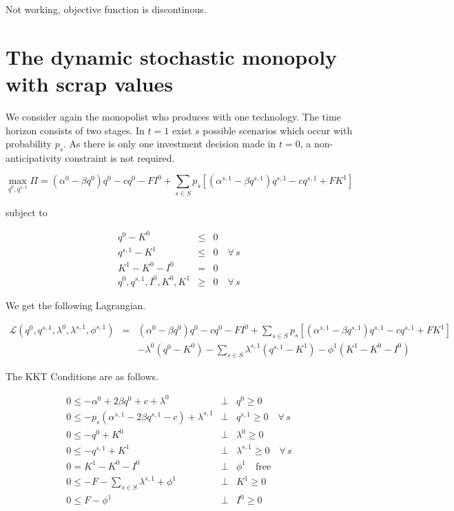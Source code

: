 \documentclass[11pt,a4paper]{article}
\begin{document}
Not working, objective function is discontinous.

\section{The dynamic stochastic monopoly with scrap values}


We consider again the monopolist who produces with one technology. The time horizon consists of two stages. In $t=1$ exist $s$ possible scenarios which occur with probability $p_s$. As there is only one investment decision made in $t=0$, a non-anticipativity constraint is not required. 

\begin{equation*}
	\max_{q^0,q^{s,1}}\Pi = (\alpha^0-\beta q^0)q^0 - cq^0 -FI^0 +  \sum_{s\in S}p_s\left[(\alpha^{s,1}-\beta q^{s,1})q^{s,1} - cq^{s,1} + FK^1\right] 
\end{equation*}

subject to

\begin{eqnarray*}
	q^0 - K^0 &\leq& 0\\
	q^{s,1} - K^{1} &\leq& 0\quad\forall\, s\\
        K^{1} - K^0 - I^0 &=& 0\\
	q^0,q^{s,1},I^0,K^0,K^{1} &\geq& 0\quad\forall\, s 
\end{eqnarray*}
 
We get the following Lagrangian.

\begin{eqnarray*}
	\mathcal{L}(q^0,q^{s,1},\lambda^0,\lambda^{s,1},\phi^{s,1})&=& (\alpha^0-\beta q^0)q^0 - cq^0 - FI^0 + \sum_{s\in S}p_s\left[(\alpha^{s,1}-\beta q^{s,1})q^{s,1} - cq^{s,1} + FK^1\right]  \\
        && - \lambda^0(q^0-K^0) - \sum_{s\in S}\lambda^{s,1}(q^{s,1}-K^{1}) - \phi^{1}(K^{1}-K^0-I^0)
\end{eqnarray*}

The KKT Conditions are as follows.

\begin{eqnarray*}
	0 \leq -\alpha^0 + 2\beta q^0 + c + \lambda^0 &\bot& q^0 \geq 0\\
        0 \leq -p_s\left(\alpha^{s,1} - 2\beta q^{s,1} - c\right) + \lambda^{s,1} &\bot& q^{s,1} \geq 0\quad\forall\,s\\
	0 \leq -q^0 + K^0 &\bot& \lambda^0 \geq 0 \\
        0 \leq -q^{s,1} + K^{1} &\bot& \lambda^{s,1} \geq 0 \quad\forall\,s\\
        0 = K^1 - K^0 - I^0 &\bot& \phi^1 \quad \mbox{free} \\
        0 \leq -F -\sum_{s\in S}\lambda^{s,1} + \phi^{1} &\bot& K^1 \geq 0 \\
        0 \leq F - \phi^{1} &\bot& I^0 \geq 0 
\end{eqnarray*}
\end{document}
